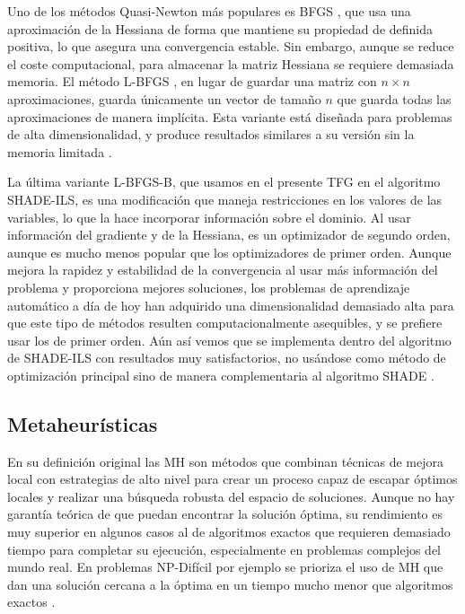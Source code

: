 Uno de los métodos Quasi-Newton más populares es BFGS \cite{BFGS}, que usa una aproximación de la Hessiana de forma que mantiene su propiedad de definida positiva, lo que asegura una convergencia estable. Sin embargo, aunque se reduce el coste computacional, para almacenar la matriz Hessiana se requiere demasiada memoria. El método L-BFGS \cite{L-BFGS}, en lugar de guardar una matriz con $n \times n$ aproximaciones, guarda únicamente un vector de tamaño $n$ que guarda todas las aproximaciones de manera implícita. Esta variante está diseñada para problemas de alta dimensionalidad, y produce resultados similares a su versión sin la memoria limitada \cite{stanford_231}.

La última variante L-BFGS-B, que usamos en el presente TFG en el algoritmo SHADE-ILS, es una modificación que maneja restricciones en los valores de las variables, lo que la hace incorporar información sobre el dominio. Al usar información del gradiente y de la Hessiana, es un optimizador de segundo orden, aunque es mucho menos popular que los optimizadores de primer orden. Aunque mejora la rapidez y estabilidad de la convergencia al usar más información del problema y proporciona mejores soluciones, los problemas de aprendizaje automático a día de hoy han adquirido una dimensionalidad demasiado alta para que este tipo de métodos resulten computacionalmente asequibles, y se prefiere usar los de primer orden. Aún así vemos que se implementa dentro del algoritmo de SHADE-ILS con resultados muy satisfactorios, no usándose como método de optimización principal sino de manera complementaria al algoritmo SHADE \cite{Numerical_optimization}.


\subsection{Metaheurísticas}
\label{sec:mh}

En su definición original las MH son métodos que combinan técnicas de mejora local con estrategias de alto nivel para crear un proceso capaz de escapar óptimos locales y realizar una búsqueda robusta del espacio de soluciones. Aunque no hay garantía teórica de que puedan encontrar la solución óptima, su rendimiento es muy superior en algunos casos al de algoritmos exactos que requieren demasiado tiempo para completar su ejecución, especialmente en problemas complejos del mundo real. En problemas NP-Difícil por ejemplo se prioriza el uso de MH que dan una solución cercana a la óptima en un tiempo mucho menor que algoritmos exactos \cite{mhhandbook}.

